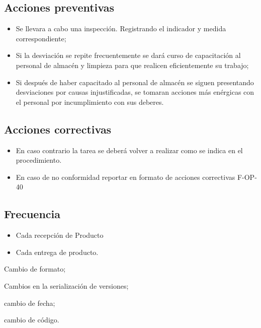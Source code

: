 \subsection{Acciones preventivas}

\begin{itemize}
	\item Se llevara a cabo una inspección. Registrando el indicador y medida correspondiente;
	\item Si la desviación se repite frecuentemente se dará curso de capacitación al personal de almacén y limpieza para que realicen eficientemente su trabajo;
	\item Si después de haber capacitado al personal de almacén se siguen presentando desviaciones por causas injustificadas, se tomaran acciones más enérgicas con el personal por incumplimiento con sus deberes.
\end{itemize}

\subsection{Acciones correctivas}

\begin{itemize}
	\item En caso contrario la tarea se deberá volver a realizar como se indica en el procedimiento.
	\item En caso de no conformidad reportar en formato de acciones correctivas F-OP-40
\end{itemize}

\subsection{Frecuencia}

\begin{itemize}
	\item Cada recepción de Producto
	\item Cada entrega de producto.
\end{itemize}

\begin{changelog}[simple, sectioncmd=\subsection*,label=changelog-2.2]
	
	\begin{version}[v=2.1, date=2023--01, author=Pablo E. Alanis]
			\item Cambio de formato;
			\item Cambios en la serialización de versiones;
	\end{version}

	\begin{version}[v=1.3, date=2022--05, author=Alonso M.]
		\item cambio de fecha;
		\item cambio de código.
	\end{version}

\end{changelog}
